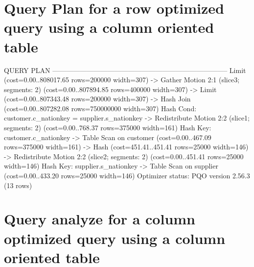 \documentclass[a4paper,11pt]{report}
\begin{document}
\chapter{Query Plan for a row optimized query using a column oriented table}
\label{ap:row-better-col}

\begin{sqlcode}
                                                       QUERY PLAN            
-----------------------------------------------------------------------------
 Limit  (cost=0.00..808017.65 rows=200000 width=307)
   ->  Gather Motion 2:1  (slice3; segments: 2)  (cost=0.00..807894.85 rows=400000 width=307)
         ->  Limit  (cost=0.00..807343.48 rows=200000 width=307)
               ->  Hash Join  (cost=0.00..807282.08 rows=750000000 width=307)
                     Hash Cond: customer.c_nationkey = supplier.s_nationkey
                     ->  Redistribute Motion 2:2  (slice1; segments: 2)  (cost=0.00..768.37 rows=375000 width=161)
                           Hash Key: customer.c_nationkey
                           ->  Table Scan on customer  (cost=0.00..467.09 rows=375000 width=161)
                     ->  Hash  (cost=451.41..451.41 rows=25000 width=146)
                           ->  Redistribute Motion 2:2  (slice2; segments: 2)  (cost=0.00..451.41 rows=25000 width=146)
                                 Hash Key: supplier.s_nationkey
                                 ->  Table Scan on supplier  (cost=0.00..433.20 rows=25000 width=146)
 Optimizer status: PQO version 2.56.3
(13 rows)
\end{sqlcode}

\chapter{Query analyze for a column optimized query using a column oriented
  table}
\label{ap:explain-analyze}
\end{document}
